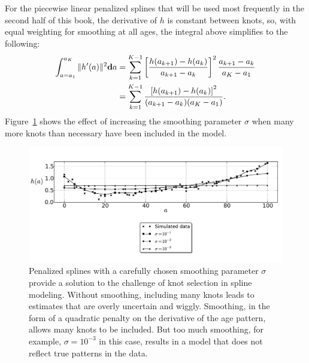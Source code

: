 For the piecewise linear penalized splines that will be used most
frequently in the second half of this book, the derivative of $h$ is
constant between knots, so, with equal weighting for smoothing at all
ages, the integral above simplifies to the following:
\begin{align*}
\int _{a=a_1} ^{a_K} \| h'(a) \|^2 \mathbf{d} a
& = \sum_{k=1} ^{K-1} \left[\frac{h(a_{k+1}) - h(a_k)}{a_{k+1}-a_k}\right]^2 \frac{a_{k+1}-a_k}{a_K - a_1}\\
&= \sum_{k=1} ^{K-1} \frac{\left[h(a_{k+1}) - h(a_k)\right]^2}{(a_{k+1}-a_k)(a_K - a_1)}.
\end{align*}
Figure~\ref{smoothing-splines} shows the effect of increasing the
smoothing parameter $\sigma$ when many more knots than necessary have been included in the model.

\begin{figure}[h]
\begin{center}
\includegraphics[width=\textwidth]{smoothing-splines.pdf}
\caption[Penalized splines with a carefully chosen smoothing
  parameter.]{Penalized splines with a carefully chosen smoothing parameter
  $\sigma$ provide a solution to the challenge of knot selection in
  spline modeling.  Without smoothing, including many knots leads to
  estimates that are overly uncertain and wiggly.  Smoothing, in the
  form of a quadratic penalty on the derivative of the age pattern,
  allows many knots to be included.  But too much smoothing, for
  example, $\sigma=10^{-3}$ in this case, results in a model that does
  not reflect true patterns in the data.}
\label{smoothing-splines}
\end{center}
\end{figure}


